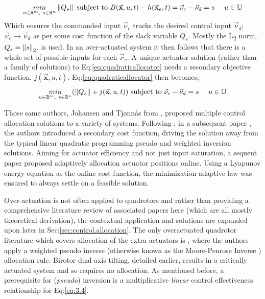 \begin{equation}\label{eq:quadraticallocator}
\underset{u \in \mathbb{R}^m,~s \in \mathbb{R}^n}{min}\left\lVert Q_s\right\rVert ~\text{subject to} ~B(\vec{\mathbf{x}},u,t) - h(\vec{\mathbf{x}}_e,t)=\vec{\nu}_c-\vec{\nu}_d=s~~~~u \in \mathbb{U}
\end{equation}
Which ensures the commanded input $\vec{\nu}_c$ tracks the desired control input $\vec{\nu}_d$; $\vec{\nu}_c\rightarrow\vec{\nu}_d$ as per some cost function of the slack variable $Q_s$. Mostly the L\textsubscript{2} norm, $Q_s=\left\lVert s\right\rVert_2$, is used. In an over-actuated system it then follows that there is a whole set of possible inputs for each $\vec{\nu}_c$. A unique actuator solution (rather than a family of solutions) to Eq:\ref{eq:quadraticallocator} needs a secondary objective function, $j(\vec{\mathbf{x}},u,t)$. Eq:\ref{eq:quadraticallocator} then becomes;
\begin{equation} \label{eq:quadraticallocatorcost}
\underset{u \in \mathbb{R}^m,~s \in \mathbb{R}^n}{min}(\left\lVert Q_s\right\rVert+j(\vec{\mathbf{x}},u,t)) ~\text{subject to} ~\vec{\nu}_c - \vec{\nu}_d=s~~~~u \in \mathbb{U}
\end{equation}
\par
Those same authors, Johansen and Tj{\o}nn\r{a}s from \cite{allocation,efficientallocation,adaptiveallocation}, proposed multiple control allocation solutions to a variety of systems. Following \cite{allocation}; in a subsequent paper \cite{efficientallocation}, the authors introduced a secondary cost function, driving the solution away from the typical linear quadratic programming pseudo and weighted inversion solutions.  Aiming for actuator efficiency and not just input saturation, a sequent paper \cite{adaptiveallocation} proposed adaptively allocation actuator positions online. Using a Lyapunov energy equation as the online cost function, the minimization adaptive law was ensured to always settle on a feasible solution.
\par
Over-actuation is not often applied to quadrotors and rather than providing a comprehensive literature review of associated papers here (which are all mostly theoretical derivation), the contextual application and solutions are expanded upon later in Sec:\ref{sec:control.allocation}. The only overactuated quadrotor literature which covers allocation of the extra actuators is \cite{tiltgasco,tiltrihani}, where the authors apply a weighted pseudo inverse (otherwise known as the Moore-Penrose Inverse \cite{moorepenrose}) allocation rule. Birotor dual-axis tilting, detailed earlier, results in a critically actuated system and so requires no allocation. As mentioned before, a prerequisite for (\emph{pseudo}) inversion is a multiplicative \emph{linear} control effectiveness relationship for Eq:\ref{eq:3.4}. 
